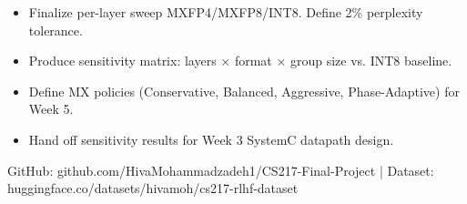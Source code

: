 \documentclass[10pt]{article}
\begin{document}
\begin{itemize}[leftmargin=*, noitemsep, topsep=0pt]
\item Finalize per-layer sweep MXFP4/MXFP8/INT8. Define 2\% perplexity tolerance.
\item Produce sensitivity matrix: layers × format × group size vs. INT8 baseline.
\item Define MX policies (Conservative, Balanced, Aggressive, Phase-Adaptive) for Week 5.
\item Hand off sensitivity results for Week 3 SystemC datapath design.
\end{itemize}
\vspace{0.3em}

\noindent\scriptsize{GitHub: github.com/HivaMohammadzadeh1/CS217-Final-Project | Dataset: huggingface.co/datasets/hivamoh/cs217-rlhf-dataset}
\end{document}

